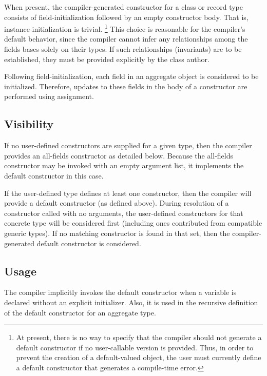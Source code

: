 When present, the compiler-generated constructor for a class or record type
consists of field-initialization followed by an empty constructor body.  That
is, instance-initialization is trivial.
\footnote{At present, there is no way to specify that the compiler should not generate a
default constructor if no user-callable version is provided.  Thus, in order to
prevent the creation of a default-valued object, the user must currently define
a default constructor that generates a compile-time error.}
This choice is reasonable for the
compiler's default behavior, since the compiler cannot infer any relationships
among the fields bases solely on their types.  If such relationships
(invariants) are to be established, they must be provided explicitly by the
class author.

\begin{note}

Following field-initialization, each field in an aggregate object is considered
to be initialized.  Therefore, updates to these fields in the body of a
constructor are performed using assignment.

\end{note}

\subsection{Visibility}

If no user-defined constructors are supplied for a given type, then the compiler
provides an all-fields constructor as detailed below.  Because the all-fields
constructor may be invoked with an empty argument list, it implements the
default constructor in this case.

If the user-defined type defines at least one constructor, then the compiler
will provide a default constructor (as defined above).  During resolution of a
constructor called with no arguments, the user-defined constructors for that
concrete type will be considered first (including ones contributed from
compatible generic types).  If no matching constructor is found in that set,
then the compiler-generated default constructor is considered.

\subsection{Usage}

The compiler implicitly invokes the default constructor when a variable is
declared without an explicit initializer.  Also, it is used in the recursive
definition of the default constructor for an aggregate type.

